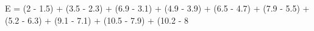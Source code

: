 \documentclass[preview]{standalone}
\begin{document}
\begin{center}
E = (2 - 1.5) + (3.5 - 2.3) + (6.9 - 3.1) + (4.9 - 3.9) + (6.5 - 4.7) + (7.9 - 5.5) + (5.2 - 6.3) + (9.1 - 7.1) + (10.5 - 7.9) + (10.2 - 8
\end{center}
\end{document}
